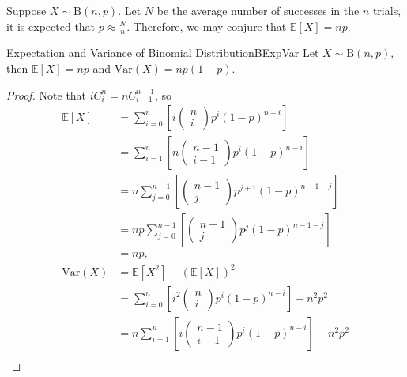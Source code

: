 \documentclass[math]{amznotes}
\theoremstyle{remark}
\newcommand{\0}{\mathbf{0}}
\newcommand{\1}{\mathbf{1}}
\begin{document}
Suppose $X \sim \mathrm{B}(n, p)$. Let $N$ be the average number of successes in the $n$ trials, it is expected that $p \approx \frac{N}{n}$. Therefore, we may conjure that $\mathbb{E}\left[X\right] = np$.
\begin{probox}{Expectation and Variance of Binomial Distribution}{BExpVar}
    Let $X \sim \mathrm{B}(n, p)$, then $\mathbb{E}[X] = np$ and $\mathrm{Var}(X) = np(1 - p)$.
    \tcblower
    \begin{proof}
        Note that $iC^n_i = nC^{n - 1}_{i - 1}$, so
        \begin{align*}
            \mathbb{E}[X] & = \sum_{i = 0}^{n}\left[i \begin{pmatrix}
                n \\
                i
            \end{pmatrix}p^i(1 - p)^{n - i}\right] \\
            & = \sum_{i = 1}^{n}\left[n \begin{pmatrix}
                n - 1 \\
                i - 1
            \end{pmatrix}p^i(1 - p)^{n - i}\right] \\
            & = n\sum_{j = 0}^{n - 1}\left[\begin{pmatrix}
                n - 1 \\
                j
            \end{pmatrix}p^{j + 1}(1 - p)^{n - 1 - j}\right] \\
            & = np\sum_{j = 0}^{n - 1}\left[\begin{pmatrix}
                n - 1 \\
                j
            \end{pmatrix}p^j(1 - p)^{n - 1 - j}\right] \\
            & = np, \\
            \mathrm{Var}(X) & = \mathbb{E}[X^2] - (\mathbb{E}[X])^2 \\
            & = \sum_{i = 0}^{n}\left[i^2\begin{pmatrix}
                n \\
                i
            \end{pmatrix}p^i(1 - p)^{n - i}\right] - n^2p^2 \\
            & = n\sum_{i = 1}^{n}\left[i\begin{pmatrix}
                n - 1 \\
                i - 1
            \end{pmatrix}p^i(1 - p)^{n - i}\right] - n^2p^2 \\

\end{align*}
\end{proof}
\end{probox}
\end{document}
